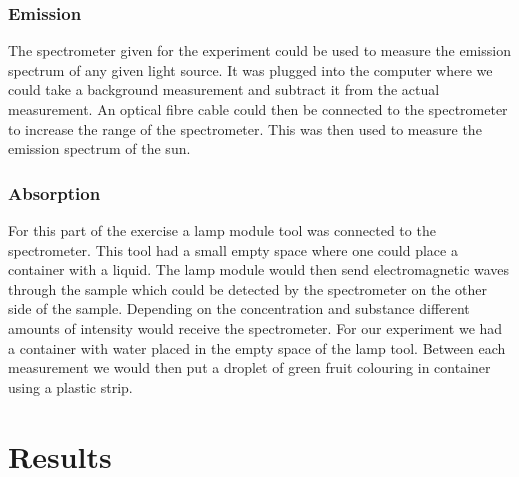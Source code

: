 \documentclass[working, oneside]{inputs/tuftebook}
\begin{document}
\subsubsection*{Emission}
The spectrometer given for the experiment could be used to measure the emission spectrum of any given light source. It was plugged into the computer where we could take a background measurement and subtract it from the actual measurement. An optical fibre cable could then be connected to the spectrometer to increase the range of the spectrometer. This was then used to measure the emission spectrum of the sun.
\subsubsection*{Absorption}
For this part of the exercise a lamp module tool was connected to the spectrometer. This tool had a small  empty space where one could place a container with a liquid. The lamp module would then send electromagnetic waves through the sample which could  be detected by the spectrometer on the other side of the sample. Depending on the concentration and substance different amounts of intensity would receive the spectrometer. For our experiment we had a container with water placed in the empty space of the lamp tool. Between each measurement we would then put a droplet of green fruit colouring in container using a plastic strip.  
\section*{Results}
\end{document}
